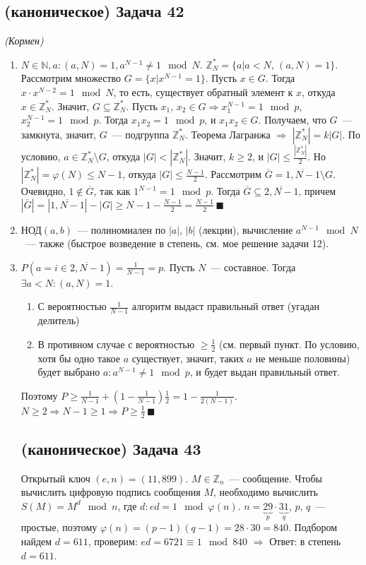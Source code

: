 \documentclass[a4paper]{article}
\newcommand{\ZZ}{\mathbb{Z}}
\newcommand{\NN}{\mathbb{N}}
\begin{document}
\begin{enumerate}
\subsection*{(каноническое) Задача 42}
{\em (Кормен)}
\begin{enumerate}
\item $N\in\NN,a\colon (a,N)=1, a^{N-1}\neq 1\mod N$. $\ZZ_N^*=\{a\big|a<N,\,(a,N)=1\}$. Рассмотрим множество $G=\{x\big|x^{N-1}=1\}$. Пусть $x\in G$. Тогда $x\cdot x^{N-2}=1\mod N$, то есть, существует обратный элемент к $x$, откуда $x\in \ZZ_N^*$. Значит, $G\subseteq \ZZ_N^*$. Пусть $x_1,\,x_2\in G\Rightarrow x_1^{N-1}=1\mod p$, $x_2^{N-1}=1\mod p$. Тогда $x_1x_2=1\mod p$, и $x_1x_2\in G$. Получаем, что $G$~--- замкнута, значит, $G$~--- подгруппа $\ZZ_N^*$. Теорема Лагранжа $\Rightarrow$ $|\ZZ_N^*|=k|G|$. По условию, $a\in\ZZ_N^*\setminus G$, откуда $|G|<|\ZZ_N^*|$. Значит, $k\geqslant 2$, и $|G|\leqslant \frac{|\ZZ_N^*|}{2}$. Но $|\ZZ_N^*|=\varphi(N)\leqslant N-1$, откуда $|G|\leqslant\frac{N-1}{2}$. Рассмотрим $\overline{G}=\overline{1,N-1}\setminus G$. Очевидно, $1\notin \overline{G}$, так как $1^{N-1}=1\mod p$. Тогда $\overline{G}\subseteq\overline{2,N-1}$, причем $|\overline{G}|=|\overline{1,N-1}|-|G|\geqslant N-1-\frac{N-1}{2}=\frac{N-1}{2}\,\blacksquare$
\item $\mbox{НОД}(a,b)$~--- полиномиален по $|a|,\,|b|$ (лекции), вычисление $a^{N-1}\mod N$~--- также (быстрое возведение в степень, см. мое решение задачи 12).
\item $P(a=i\in\overline{2,N-1})=\frac{1}{N-1}=p$. Пусть $N$~--- составное. Тогда $\exists a<N\colon (a,N)=1$.\begin{enumerate}
\item С вероятностью $\frac{1}{N-1}$ алгоритм выдаст правильный ответ (угадан делитель)
\item В противном случае с вероятностью $\geqslant \frac{1}{2}$ (см. первый пункт. По условию, хотя бы одно такое $a$ существует, значит, таких $a$ не меньше половины) будет выбрано $a\colon a^{N-1}\neq 1\mod p$, и будет выдан правильный ответ.
\end{enumerate}
Поэтому $P\geqslant \frac{1}{N-1}+(1-\frac{1}{N-1})\frac{1}{2}=1-\frac{1}{2(N-1)}$. $N\geqslant 2\Rightarrow N-1\geqslant 1\Rightarrow P\geqslant\frac{1}{2}\,\blacksquare$
\subsection*{(каноническое) Задача 43}
Открытый ключ $(e,n)=(11, 899)$. $M\in\ZZ_n$~--- сообщение.\newline
Чтобы вычислить цифровую подпись сообщения $M$, необходимо вычислить $S(M)=M^d\mod n$,\newline
где $d\colon ed=1\mod \varphi(n)$. $n=\underbrace{29}_p\cdot \underbrace{31}_q$, $p,\,q$~--- простые, поэтому $\varphi(n)=(p-1)(q-1)=28\cdot 30=840$.\newline
Подбором найдем $d=611$, проверим: $ed=6721\equiv 1\mod 840$ $\Rightarrow$ Ответ: в степень $d=611$.

\end{enumerate}
\end{enumerate}
\end{document}

